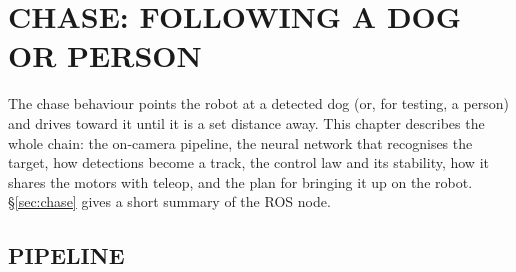 \chapter{CHASE: FOLLOWING A DOG OR PERSON}
\label{ch:chase}

The chase behaviour points the robot at a detected dog (or, for testing, a
person) and drives toward it until it is a set distance away. This chapter
describes the whole chain: the on-camera pipeline, the neural network that
recognises the target, how detections become a track, the control law and its
stability, how it shares the motors with teleop, and the plan for bringing it
up on the robot. \S\ref{sec:chase} gives a short summary of the ROS node.


\section{PIPELINE}
\label{sec:chasepipe}

